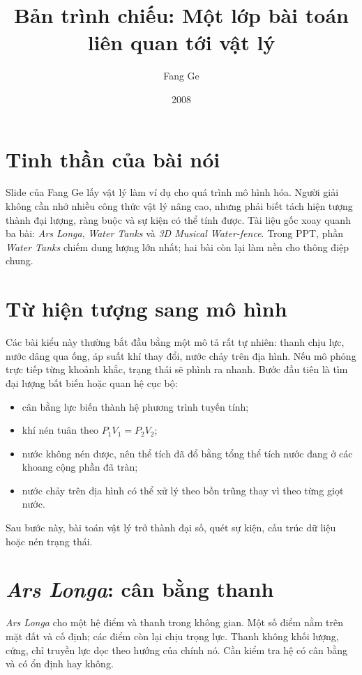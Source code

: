 \documentclass[11pt]{article}
\title{Bản trình chiếu: Một lớp bài toán liên quan tới vật lý}
\author{Fang Ge}
\date{2008}
\begin{document}
\maketitle


\section{Tinh thần của bài nói}

Slide của Fang Ge lấy vật lý làm ví dụ cho quá trình mô hình hóa. Người giải
không cần nhớ nhiều công thức vật lý nâng cao, nhưng phải biết tách hiện tượng
thành đại lượng, ràng buộc và sự kiện có thể tính được. Tài liệu gốc xoay
quanh ba bài: \textit{Ars Longa}, \textit{Water Tanks} và \textit{3D Musical
Water-fence}. Trong PPT, phần \textit{Water Tanks} chiếm dung lượng lớn nhất;
hai bài còn lại làm nền cho thông điệp chung.

\section{Từ hiện tượng sang mô hình}

Các bài kiểu này thường bắt đầu bằng một mô tả rất tự nhiên: thanh chịu lực,
nước dâng qua ống, áp suất khí thay đổi, nước chảy trên địa hình. Nếu mô phỏng
trực tiếp từng khoảnh khắc, trạng thái sẽ phình ra nhanh. Bước đầu tiên là tìm
đại lượng bất biến hoặc quan hệ cục bộ:
\begin{itemize}
  \item cân bằng lực biến thành hệ phương trình tuyến tính;
  \item khí nén tuân theo \(P_1V_1=P_2V_2\);
  \item nước không nén được, nên thể tích đã đổ bằng tổng thể tích nước đang
  ở các khoang cộng phần đã tràn;
  \item nước chảy trên địa hình có thể xử lý theo bồn trũng thay vì theo từng
  giọt nước.
\end{itemize}
Sau bước này, bài toán vật lý trở thành đại số, quét sự kiện, cấu trúc dữ liệu
hoặc nén trạng thái.

\section{\textit{Ars Longa}: cân bằng thanh}

\textit{Ars Longa} cho một hệ điểm và thanh trong không gian. Một số điểm nằm
trên mặt đất và cố định; các điểm còn lại chịu trọng lực. Thanh không khối
lượng, cứng, chỉ truyền lực dọc theo hướng của chính nó. Cần kiểm tra hệ có
cân bằng và có ổn định hay không.
\end{document}
